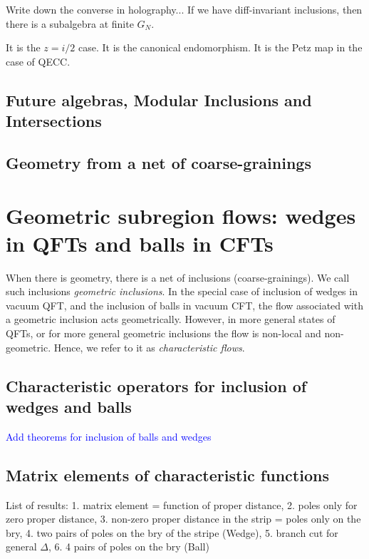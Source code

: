 \documentclass[a4paper,11pt]{article}
\theoremstyle{definition}
\newcommand{\NL}[1]{\textcolor{blue}{#1}}
\begin{document}
Write down the converse in holography... If we have diff-invariant inclusions, then there is a subalgebra at finite $G_N$.



It is the $z=i/2$ case. It is the canonical endomorphism. It is the Petz map in the case of QECC.

\subsection{Future algebras, Modular Inclusions and Intersections}

\subsection{Geometry from a net of coarse-grainings}




\section{Geometric subregion flows: wedges in QFTs and balls in CFTs}

When there is geometry, there is a net of inclusions (coarse-grainings). We call such inclusions {\it geometric inclusions}. In the special case of inclusion of wedges in vacuum QFT, and the inclusion of balls in vacuum CFT, the flow associated with a geometric inclusion acts geometrically. However, in more general states of QFTs, or for more general geometric inclusions the flow is non-local and non-geometric. Hence, we refer to it as {\it characteristic flows}.

\subsection{Characteristic operators for inclusion of wedges and balls}



 \NL{Add theorems for inclusion of balls and wedges}


\subsection{Matrix elements of characteristic functions}

List of results: 1. matrix element = function of proper distance, 2. poles only for zero proper distance, 3. non-zero proper distance in the strip = poles only on the bry, 4. two pairs of poles on the bry of the stripe (Wedge), 5. branch cut for general $\Delta$, 6. 4 pairs of poles on the bry (Ball)
\end{document}
